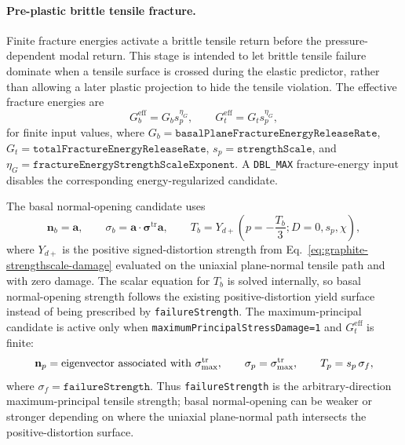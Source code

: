 \paragraph{Pre-plastic brittle tensile fracture.}
Finite fracture energies activate a brittle tensile return before the pressure-dependent modal return.  This stage is intended to let brittle tensile failure dominate when a tensile surface is crossed during the elastic predictor, rather than allowing a later plastic projection to hide the tensile violation.  The effective fracture energies are
\begin{equation}
  G_b^{\mathrm{eff}} = G_b s_p^{\eta_G},
  \qquad
  G_t^{\mathrm{eff}} = G_t s_p^{\eta_G},
  \label{eq:graphite-effective-fracture-energy}
\end{equation}
for finite input values, where \(G_b=\texttt{basalPlaneFractureEnergyReleaseRate}\), \(G_t=\texttt{totalFractureEnergyReleaseRate}\), \(s_p=\texttt{strengthScale}\), and \(\eta_G=\texttt{fractureEnergyStrengthScaleExponent}\).  A \texttt{DBL\_MAX} fracture-energy input disables the corresponding energy-regularized candidate.

The basal normal-opening candidate uses
\begin{equation}
  \mathbf n_b=\mathbf a,
  \qquad
  \sigma_b=\mathbf a\cdot\boldsymbol{\sigma}^{\mathrm{tr}}\mathbf a,
  \qquad
  T_b=Y_{d+}\!\left(p=-\frac{T_b}{3};D=0,s_p,\chi\right),
  \label{eq:graphite-basal-tensile-strength}
\end{equation}
where \(Y_{d+}\) is the positive signed-distortion strength from Eq.~\eqref{eq:graphite-strengthscale-damage} evaluated on the uniaxial plane-normal tensile path and with zero damage.  The scalar equation for \(T_b\) is solved internally, so basal normal-opening strength follows the existing positive-distortion yield surface instead of being prescribed by \texttt{failureStrength}.  The maximum-principal candidate is active only when \texttt{maximumPrincipalStressDamage=1} and \(G_t^{\mathrm{eff}}\) is finite:
\begin{equation}
  \mathbf n_p=\hbox{eigenvector associated with }\sigma_{\max}^{\mathrm{tr}},
  \qquad
  \sigma_p=\sigma_{\max}^{\mathrm{tr}},
  \qquad
  T_p=s_p\,\sigma_f,
  \label{eq:graphite-principal-tensile-strength}
\end{equation}
where \(\sigma_f=\texttt{failureStrength}\).  Thus \texttt{failureStrength} is the arbitrary-direction maximum-principal tensile strength; basal normal-opening can be weaker or stronger depending on where the uniaxial plane-normal path intersects the positive-distortion surface.


